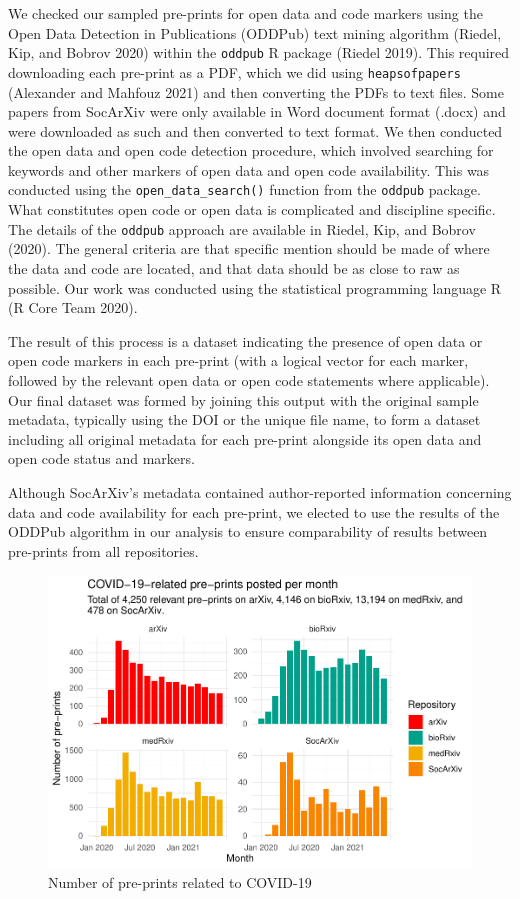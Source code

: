 \documentclass[
]{article}
\begin{document}
We checked our sampled pre-prints for open data and code markers using the Open Data Detection in Publications (ODDPub) text mining algorithm (Riedel, Kip, and Bobrov 2020) within the \texttt{oddpub} R package (Riedel 2019). This required downloading each pre-print as a PDF, which we did using \texttt{heapsofpapers} (Alexander and Mahfouz 2021) and then converting the PDFs to text files. Some papers from SocArXiv were only available in Word document format (.docx) and were downloaded as such and then converted to text format. We then conducted the open data and open code detection procedure, which involved searching for keywords and other markers of open data and open code availability. This was conducted using the \texttt{open\_data\_search()} function from the \texttt{oddpub} package. What constitutes open code or open data is complicated and discipline specific. The details of the \texttt{oddpub} approach are available in Riedel, Kip, and Bobrov (2020). The general criteria are that specific mention should be made of where the data and code are located, and that data should be as close to raw as possible. Our work was conducted using the statistical programming language R (R Core Team 2020).

The result of this process is a dataset indicating the presence of open data or open code markers in each pre-print (with a logical vector for each marker, followed by the relevant open data or open code statements where applicable). Our final dataset was formed by joining this output with the original sample metadata, typically using the DOI or the unique file name, to form a dataset including all original metadata for each pre-print alongside its open data and open code status and markers.

Although SocArXiv's metadata contained author-reported information concerning data and code availability for each pre-print, we elected to use the results of the ODDPub algorithm in our analysis to ensure comparability of results between pre-prints from all repositories.

\begin{figure}

{\centering \includegraphics[width=0.9\linewidth]{paper_files/figure-latex/monthly-papers-total-1} 

}

\caption{Number of pre-prints related to COVID-19}\label{fig:monthly-papers-total}
\end{figure}
\end{document}
